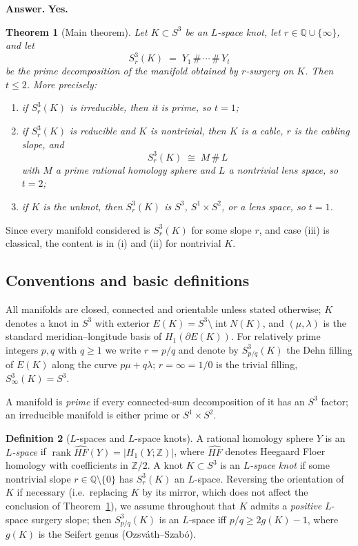 \documentclass[11pt]{article}
\newtheorem{theorem}{Theorem}[section]
\theoremstyle{definition}
\newtheorem{definition}[theorem]{Definition}
\theoremstyle{remark}
\DeclareMathOperator{\rank}{rank}
\newcommand{\HF}{\widehat{HF}}
\newcommand{\Z}{\mathbb{Z}}
\begin{document}
\medskip
\noindent\textbf{Answer.} \textbf{Yes.}

\begin{theorem}[Main theorem]\label{thm:main}
Let $K\subset S^{3}$ be an $L$-space knot, let $r\in\mathbb{Q}\cup\{\infty\}$,
and let
\[
S^{3}_{r}(K)\;=\;Y_{1}\,\#\,\cdots\,\#\,Y_{t}
\]
be the prime decomposition of the manifold obtained by $r$-surgery on $K$.
Then $t\le 2$.  More precisely:
\begin{enumerate}[label=\textup{(\roman*)},leftmargin=2.2em]
 \item if $S^{3}_{r}(K)$ is irreducible, then it is prime, so $t=1$;
 \item if $S^{3}_{r}(K)$ is reducible and $K$ is nontrivial, then $K$ is a
 cable, $r$ is the cabling slope, and
 \[
 S^{3}_{r}(K)\;\cong\;M\,\#\,L
 \]
 with $M$ a prime rational homology sphere and $L$ a nontrivial lens space, so
 $t=2$;
 \item if $K$ is the unknot, then $S^{3}_{r}(K)$ is $S^3$, $S^1\times S^2$, or
 a lens space, so $t=1$.
\end{enumerate}
\end{theorem}

Since every manifold considered is $S^3_r(K)$ for some slope $r$, and case
(iii) is classical, the content is in (i) and (ii) for nontrivial $K$.

\subsection{Conventions and basic definitions}

All manifolds are closed, connected and orientable unless stated otherwise;
$K$ denotes a knot in $S^3$ with exterior $E(K)=S^{3}\setminus \operatorname{int}N(K)$,
and $(\mu,\lambda)$ is the standard meridian--longitude basis of
$H_1(\partial E(K))$.  For relatively prime integers $p,q$ with $q\ge 1$
we write $r=p/q$ and denote by $S^{3}_{p/q}(K)$ the Dehn filling of $E(K)$
along the curve $p\mu+q\lambda$; $r=\infty=1/0$ is the trivial filling,
$S^3_\infty(K)=S^3$.

A manifold is \emph{prime} if every connected-sum decomposition of it has an
$S^3$ factor; an irreducible manifold is either prime or $S^1\times S^2$.

\begin{definition}[$L$-spaces and $L$-space knots]
A rational homology sphere $Y$ is an \emph{$L$-space} if
$\rank \HF(Y)=|H_1(Y;\Z)|$, where $\HF$ denotes Heegaard Floer homology with
coefficients in $\Z/2$.  A knot $K\subset S^3$ is an \emph{$L$-space knot} if
some nontrivial slope $r\in\mathbb{Q}\setminus\{0\}$ has $S^3_r(K)$ an
$L$-space.  Reversing the orientation of $K$ if necessary (i.e.\ replacing $K$
by its mirror, which does not affect the conclusion of
Theorem~\ref{thm:main}), we assume throughout that $K$ admits a
\emph{positive} $L$-space surgery slope; then $S^3_{p/q}(K)$ is an $L$-space
iff $p/q\ge 2g(K)-1$, where $g(K)$ is the Seifert genus
(Ozsv\'ath--Szab\'o).
\end{definition}
\end{document}
